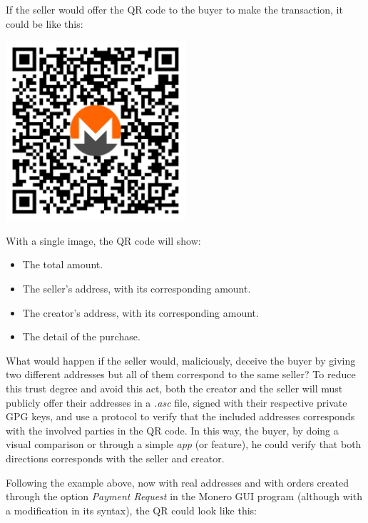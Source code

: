 \documentclass[12pt,a4paper]{article}
\begin{document}
If the seller would offer the QR code to the buyer to make the transaction, it could be like this:

\begin{center}
\includegraphics[width=0.5\textwidth]{media/qr-code-en.pdf}
\end{center}

With a single image, the QR code will show:

\begin{itemize}
\item The total amount.
\item The seller's address, with its corresponding amount.
\item The creator's address, with its corresponding amount.
\item The detail of the purchase.
\end{itemize}

What would happen if the seller would, maliciously, deceive the buyer by giving two different addresses but all of them correspond to the same seller? To reduce this trust degree and avoid this act, both the creator and the seller will must publicly offer their addresses in a \textit{.asc} file, signed with their respective private GPG keys, and use a protocol to verify that the included addresses corresponds with the involved parties in the QR code. In this way, the buyer, by doing a visual comparison or through a simple \textit{app} (or feature), he could verify that both directions corresponds with the seller and creator.

Following the example above, now with real addresses and with orders created through the option \textit{Payment Request} in the Monero GUI program (although with a modification in its syntax), the QR could look like this:
\end{document}
